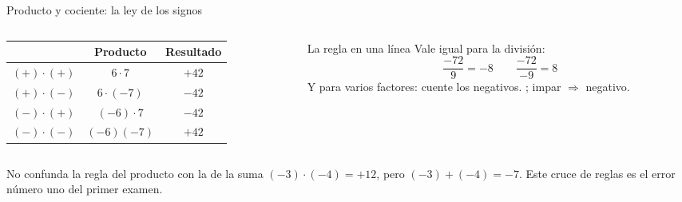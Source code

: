 \documentclass[aspectratio=169,10pt]{beamer}
\begin{document}
	\begin{frame}{Producto y cociente: la ley de los signos}
		\scriptsize
		\begin{columns}[T,onlytextwidth]
			\begin{column}{0.42\textwidth}
				\begin{center}
					\begin{tabular}{@{}ccc@{}}
						\toprule
						& \textbf{Producto} & \textbf{Resultado} \\
						\midrule
						$(+)\cdot(+)$ & $6\cdot 7$ & $+42$ \\
						$(+)\cdot(-)$ & $6\cdot(-7)$ & $-42$ \\
						$(-)\cdot(+)$ & $(-6)\cdot 7$ & $-42$ \\
						$(-)\cdot(-)$ & $(-6)(-7)$ & $+42$ \\
						\bottomrule
					\end{tabular}
				\end{center}
			\end{column}
			\begin{column}{0.55\textwidth}
				\begin{block}{La regla en una línea}
					\tiny
					Vale igual para la división:
					\[ \frac{-72}{9} = -8 \qquad \frac{-72}{-9} = 8 \]
					Y para varios factores: cuente los negativos. ; impar $\Rightarrow$ negativo.
				\end{block}
			\end{column}
		\end{columns}
		
		\vspace{0.1cm}
		\begin{alertblock}{No confunda la regla del producto con la de la suma}
			\tiny
			$(-3)\cdot(-4) = +12$, \quad pero \quad $(-3)+(-4) = -7$.
			Este cruce de reglas es el error número uno del primer examen.
		\end{alertblock}
	\end{frame}
	
\end{document}

